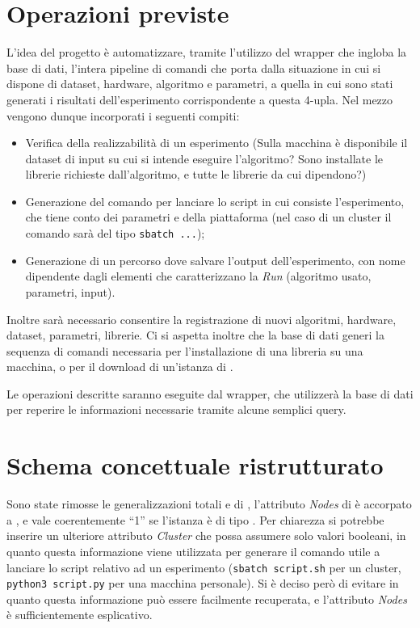 \documentclass{article}
\begin{document}
\section{Operazioni previste}
L'idea del progetto è automatizzare, tramite l'utilizzo del wrapper che ingloba la base di dati, l'intera pipeline di comandi che porta dalla situazione in cui si dispone di dataset, hardware, algoritmo e parametri, a quella in cui sono stati generati i risultati dell'esperimento corrispondente a questa 4-upla. Nel mezzo vengono dunque incorporati i seguenti compiti:
\begin{itemize}
    \item Verifica della realizzabilità di un esperimento (Sulla macchina è disponibile il dataset di input su cui si intende eseguire l'algoritmo? Sono installate le librerie richieste dall'algoritmo, e tutte le librerie da cui dipendono?)
    \item Generazione del comando per lanciare lo script in cui consiste l'esperimento, che tiene conto dei parametri e della piattaforma (nel caso di un cluster il comando sarà del tipo \texttt{sbatch ...});
    \item Generazione di un percorso dove salvare l'output dell'esperimento, con nome dipendente dagli elementi che caratterizzano la \emph{Run} (algoritmo usato, parametri, input).
\end{itemize}
Inoltre sarà necessario consentire la registrazione di nuovi algoritmi, hardware, dataset, parametri, librerie. Ci si aspetta inoltre che la base di dati generi la sequenza di comandi necessaria per l'installazione di una libreria su una macchina, o per il download di un'istanza di .

Le operazioni descritte saranno eseguite dal wrapper, che utilizzerà la base di dati per reperire le informazioni necessarie tramite alcune semplici query.

\section{Schema concettuale ristrutturato}
Sono state rimosse le generalizzazioni totali  e  di , l'attributo \emph{Nodes} di  è accorpato a , e vale coerentemente ``1'' se l'istanza è di tipo . Per chiarezza si potrebbe inserire un ulteriore attributo \emph{Cluster} che possa assumere solo valori booleani, in quanto questa informazione viene utilizzata per generare il comando utile a lanciare lo script relativo ad un esperimento (\texttt{sbatch script.sh} per un cluster, \texttt{python3 script.py} per una macchina personale). Si è deciso però di evitare in quanto questa informazione può essere facilmente recuperata, e l'attributo \emph{Nodes} è sufficientemente esplicativo.
\end{document}
